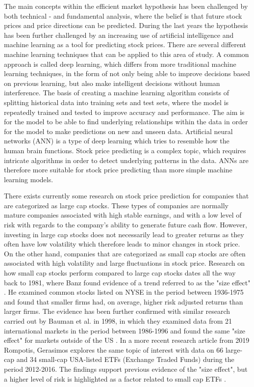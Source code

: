 \indent \newline 
The main concepts within the efficient market hypothesis has been challenged by both technical - and fundamental analysis, where the belief is that future stock prices and price directions can be predicted. During the last years the hypothesis has been further challenged by an increasing use of artificial intelligence and machine learning as a tool for predicting stock prices. There are several different machine learning techniques that can be applied to this area of study. A common approach is called deep learning, which differs from more traditional machine learning techniques, in the form of not only being able to improve decisions based on previous learning, but also make intelligent decisions without human interference. The basis of creating a machine learning algorithm consists of splitting historical data into training sets and test sets, where the model is repeatedly trained and tested to improve accuracy and performance. The aim is for the model to be able to find underlying relationships within the data in order for the model to make predictions on new and unseen data. Artificial neural networks (ANN) is a type of deep learning which tries to resemble how the human brain functions. Stock price predicting is a complex topic, which requires intricate algorithms in order to detect underlying patterns in the data. ANNs are therefore more suitable for stock price predicting than more simple machine learning models.

\indent \newline 
There exists currently some research on stock price prediction for companies that are categorized as large cap stocks. These types of companies are normally mature companies associated with high stable earnings, and with a low level of risk with regards to the company's ability to generate future cash flow. However, investing in large cap stocks does not necessarily lead to greater returns as they often have low volatility which therefore leads to minor changes in stock price. On the other hand, companies that are categorized as small cap stocks are often associated with high volatility and large fluctuations in stock price. Research on how small cap stocks perform compared to large cap stocks dates all the way back to 1981, where Banz found evidence of a trend referred to as the "size effect" \cite{BANZ19813}. He examined common stocks listed on NYSE in the period between 1936-1975 and found that smaller firms had, on average, higher risk adjusted returns than larger firms. The evidence has been further confirmed with similar research carried out by Bauman et al. in 1998, in which they examined data from 21 international markets in the period between 1986-1996 and found the same "size effect" for markets outside of the US \cite{bauman}. In a more recent research article from 2019 Rompotis, Gerasimos explores the same topic of interest with data on 66 large-cap and 34 small-cap USA-listed ETFs (Exchange Traded Funds) during the period 2012-2016. The findings support previous evidence of the "size effect", but a higher level of risk is highlighted as a factor related to small cap ETFs \cite{rompotis}.

